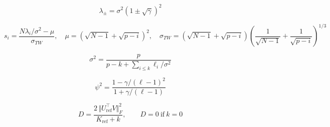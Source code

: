 
\begin{equation}
\lambda_{\pm} = \sigma^{2}\left(1 \pm \sqrt{\gamma}\right)^{2}
\end{equation}

\begin{equation}
s_i = \frac{N\lambda_i/\sigma^{2} - \mu}{\sigma_{TW}},\quad \mu = \left(\sqrt{N-1} + \sqrt{p-i}\right)^{2},\quad \sigma_{TW} = \left(\sqrt{N-1} + \sqrt{p-i}\right)\left(\frac{1}{\sqrt{N-1}} + \frac{1}{\sqrt{p-i}}\right)^{1/3}
\end{equation}

\begin{equation}
\sigma^{2} = \frac{p}{p - k + \sum_{i \leq k} \ell_i / \sigma^{2}}
\end{equation}

\begin{equation}
\psi^{2} = \frac{1 - \gamma/(\ell - 1)^{2}}{1 + \gamma/(\ell - 1)}
\end{equation}

\begin{equation}
D = \frac{2\,\Vert U_{\mathrm{ref}}^{\top} V \Vert_F^{2}}{K_{\mathrm{ref}} + k},\qquad D = 0\ \mathrm{if}\ k = 0
\end{equation}
